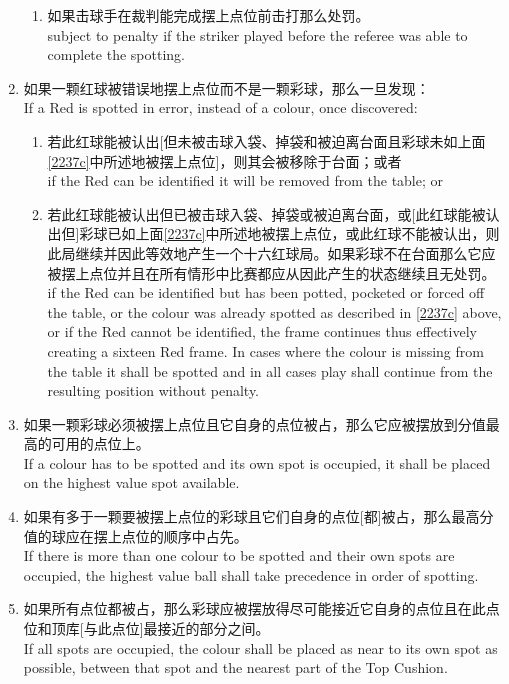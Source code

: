 \begin{enumerate}[label=(\alph*)]
\begin{enumerate}[label=(\roman*)]
        \item 如果击球手在裁判能完成摆上点位前击打那么处罚。\\
        subject to penalty if the striker played before the referee was able to complete the spotting.
    \end{enumerate}
    \item 如果一颗红球被错误地摆上点位而不是一颗彩球，那么一旦发现：\\
    If a Red is spotted in error, instead of a colour, once discovered:
    \begin{enumerate}[label=(\roman*)]
        \item 若此红球能被认出[但未被击球入袋、掉袋和被迫离台面且彩球未如上面\ref{2237c}中所述地被摆上点位]，则其会被移除于台面；或者\\
        if the Red can be identified it will be removed from the table; or
        \item 若此红球能被认出但已被击球入袋、掉袋或被迫离台面，或[此红球能被认出但]彩球已如上面\ref{2237c}中所述地被摆上点位，或此红球不能被认出，则此局继续并因此等效地产生一个十六红球局。如果彩球不在台面那么它应被摆上点位并且在所有情形中比赛都应从因此产生的状态继续且无处罚。\\
        if the Red can be identified but has been potted, pocketed or forced off the table, or the colour was already spotted as described in \ref{2237c} above, or if the Red cannot be identified, the frame continues thus effectively creating a sixteen Red frame. In cases where the colour is missing from the table it shall be spotted and in all cases play shall continue from the resulting position without penalty.
    \end{enumerate}
    \item 如果一颗彩球必须被摆上点位且它自身的点位被占，那么它应被摆放到分值最高的可用的点位上。\\
    If a colour has to be spotted and its own spot is occupied, it shall be placed on the highest value spot available.
    \item 如果有多于一颗要被摆上点位的彩球且它们自身的点位[都]被占，那么最高分值的球应在摆上点位的顺序中占先。\\
    If there is more than one colour to be spotted and their own spots are occupied, the highest value ball shall take precedence in order of spotting.
    \item 如果所有点位都被占，那么彩球应被摆放得尽可能接近它自身的点位且在此点位和顶库[与此点位]最接近的部分之间。\\
    If all spots are occupied, the colour shall be placed as near to its own spot as possible, between that spot and the nearest part of the Top Cushion.

\end{enumerate}

